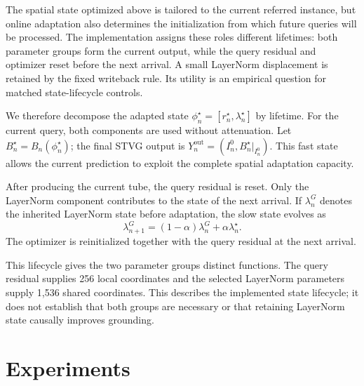 \documentclass[10pt,twocolumn,letterpaper]{article}
\newcommand{\mvIoU}{\ensuremath{m_{\mathrm{vIoU}}}}
\newcommand{\mtIoU}{\ensuremath{m_{\mathrm{tIoU}}}}
\newcommand{\msIoU}{\ensuremath{m_{\mathrm{sIoU}}}}
\begin{document}
The spatial state optimized above is tailored to the current referred instance,
but online adaptation also determines the initialization from which future
queries will be processed. The implementation assigns these roles different lifetimes: both parameter
groups form the current output, while the query residual and optimizer reset
before the next arrival. A small LayerNorm displacement is retained by the
fixed writeback rule. Its utility is an empirical question for matched
state-lifecycle controls.

We therefore decompose the adapted state
$\phi_n^\star=[r_n^\star,\lambda_n^\star]$ by lifetime.
For the current query, both components are used without attenuation.
Let $B_n^\star=B_n(\phi_n^\star)$; the final STVG output is
$Y_n^{\mathrm{out}}=(I_n^0,B_n^\star|_{I_n^0})$.
This fast state allows the current prediction to exploit the complete spatial
adaptation capacity.

After producing the current tube, the query residual is reset.
Only the LayerNorm component contributes to the state of the next arrival.
If $\lambda_n^G$ denotes the inherited LayerNorm state before adaptation, the
slow state evolves as
\begin{equation}
	\lambda_{n+1}^{G}
	=
	(1-\alpha)\lambda_n^{G}
	+
	\alpha\lambda_n^\star .
	\label{eq:slow-writeback}
\end{equation}
The optimizer is reinitialized together with the query residual at the next
arrival.

This lifecycle gives the two parameter groups distinct functions.
The query residual supplies 256 local coordinates and the selected
LayerNorm parameters supply 1,536 shared coordinates. This describes the
implemented state lifecycle; it does not establish that both groups are
necessary or that retaining LayerNorm state causally improves grounding.

\providecommand{\mvIoU}{\ensuremath{\mathrm{m}_{\mathrm{vIoU}}}}
\providecommand{\mtIoU}{\ensuremath{\mathrm{m}_{\mathrm{tIoU}}}}
\providecommand{\msIoU}{\ensuremath{\mathrm{m}_{\mathrm{sIoU}}}}

\section{Experiments}
\label{sec:experiments}
\end{document}
